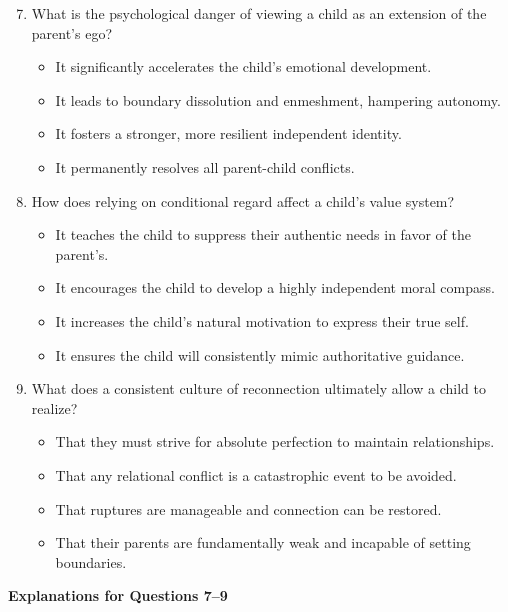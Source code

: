 \begin{practiceexercise}
\begin{enumerate}
  \setcounter{enumi}{6}
  \item What is the psychological danger of viewing a child as an extension of the parent's ego?
    \begin{itemize}
      \item[A)] It significantly accelerates the child's emotional development.
      \item[B)] It leads to boundary dissolution and enmeshment, hampering autonomy.
      \item[C)] It fosters a stronger, more resilient independent identity.
      \item[D)] It permanently resolves all parent-child conflicts.
    \end{itemize}
  \vspace{\fill}
  \item How does relying on conditional regard affect a child's value system?
    \begin{itemize}
      \item[A)] It teaches the child to suppress their authentic needs in favor of the parent's.
      \item[B)] It encourages the child to develop a highly independent moral compass.
      \item[C)] It increases the child's natural motivation to express their true self.
      \item[D)] It ensures the child will consistently mimic authoritative guidance.
    \end{itemize}
  \vspace{\fill}
  \item What does a consistent culture of reconnection ultimately allow a child to realize?
    \begin{itemize}
      \item[A)] That they must strive for absolute perfection to maintain relationships.
      \item[B)] That any relational conflict is a catastrophic event to be avoided.
      \item[C)] That ruptures are manageable and connection can be restored.
      \item[D)] That their parents are fundamentally weak and incapable of setting boundaries.
    \end{itemize}
\end{enumerate}
\vspace{\fill}

\newpage
\textbf{Explanations for Questions 7--9}


\end{practiceexercise}
